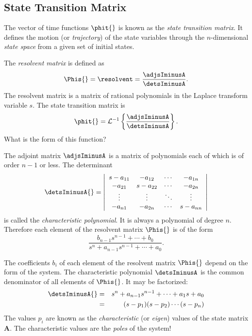 \subsection*{State Transition
Matrix}\label{ssec:state_transition_matrix} The vector of time
functions $\phit{}$ is known as the \emph{state transition
matrix}. It defines the motion (or \emph{trajectory}) of the state
variables through the $n$-dimensional \emph{state space} from a
given set of initial states.
\begin{slide}\label{slide:l4slide1}
 The \emph{resolvent matrix} is
defined as \[\Phis{} = \resolvent =
\frac{\adjsIminusA}{\detsIminusA}.\] The resolvent matrix is a
matrix of rational polynomials in the Laplace transform variable
$s$. The state transition matrix is
\[\phit{}
=
\mathcal{L}^{-1}\left\{\frac{\adjsIminusA}{\detsIminusA}\right\}.\]
What is the form of this function?
\end{slide}
\begin{slide}\label{slide:l4slide2}
 The adjoint matrix
$\adjsIminusA$ is a matrix of polynomials each of which is of
order $n-1$ or less. The determinant
\[\detsIminusA{} = \left|\begin{array}{cccc}
  s-a_{11} & -a_{12} & \cdots & -a_{1n} \\
  -a_{21} & s-a_{22} & \cdots & -a_{2n} \\
  \vdots & \vdots & \ddots & \vdots \\
  -a_{n1} & -a_{2n} & \cdots & s-a_{nn}
\end{array}\right|\] is called the \emph{characteristic polynomial}. It
is always a polynomial of degree $n$. Therefore each element of
the resolvent matrix $\Phis{}$ is of the form
\[\frac{b_{n-1}s^{n-1}+ \cdots + b_0}{s^n + a_{n-1}s^{n-1}+\cdots+a_0}.\]
\end{slide}
\begin{slide}\label{slide:l4slide3}
 The coefficients
$b_i$ of each element of the resolvent matrix $\Phis{}$ depend on
the form of the system. The characteristic polynomial
$\detsIminusA$ is the common denominator of all elements of
$\Phis{}$. It may be factorized:
\begin{eqnarray*}
\detsIminusA{}&=&s^n + a_{n-1}s^{n-1} + \cdots + a_1s + a_0
\\
&=&(s - p_1)(s-p_2)\cdots(s-p_n)
\end{eqnarray*}
The values $p_i$ are known as the \emph{characteristic} (or
\emph{eigen}) values of the state matrix $\mathbf{A}$. The
characteristic values are the \emph{poles} of the
system!
\end{slide}
